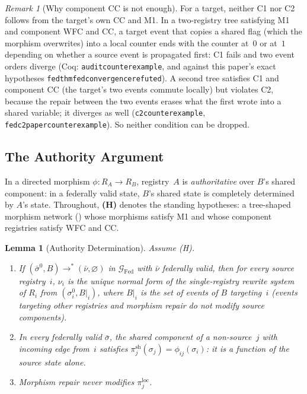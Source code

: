 \documentclass[11pt,a4paper]{article}
\theoremstyle{plain}
\newtheorem{lemma}[theorem]{Lemma}
\theoremstyle{definition}
\theoremstyle{remark}
\newtheorem{remark}[theorem]{Remark}
\newcommand{\Fed}{\mathrm{Fed}}
\renewcommand{\_}{\textunderscore\allowbreak}
\begin{document}
\begin{remark}[Why component CC is not enough]
\label{rem:why-c1c2}
For a target, neither C1 nor C2 follows from the target's own CC and M1.  In a
two-registry tree satisfying M1 and component WFC and CC, a target event that
copies a shared flag (which the morphism overwrites) into a local counter ends
with the counter at~$0$ or at~$1$ depending on whether a source event is
propagated first: C1 fails and two event orders diverge (Coq:
\texttt{audit\_counterexample}, and against this paper's exact hypotheses
\texttt{fed\_thm\_fed\_convergence\_refuted}).  A second tree satisfies C1 and
component CC (the target's two events commute locally) but violates C2,
because the repair between the two events erases what the first wrote into a
shared variable; it diverges as well (\texttt{c2\_counterexample},
\texttt{fed\_c2\_paper\_counterexample}).  So neither condition can be dropped.
\end{remark}

\subsection{The Authority Argument}

In a directed morphism $\phi: R_A \to R_B$,
registry~$A$ is \emph{authoritative} over $B$'s shared component: in a
federally valid state, $B$'s shared state is completely determined by $A$'s
state.  Throughout, \textbf{(H)} denotes the standing hypotheses: a tree-shaped
morphism network () whose morphisms satisfy M1 and whose
component registries satisfy WFC and CC.

\begin{lemma}[Authority Determination]
\label{lem:authority}
Assume (H).
\begin{enumerate}[leftmargin=*,nosep,label=(\alph*)]
\item If $(\bar{\sigma}^0, B) \to^* (\bar{\nu}, \varnothing)$ in
  $\mathcal{G}_\Fed$ with $\bar{\nu}$ federally valid, then for every source
  registry~$i$, $\nu_i$ is the unique normal form of the single-registry
  rewrite system of $R_i$ from $(\sigma^0_i, B|_i)$, where $B|_i$ is the set of
  events of $B$ targeting~$i$ (events targeting other registries and morphism
  repair do not modify source components).
\item In every federally valid $\bar{\sigma}$, the shared component of a
  non-source~$j$ with incoming edge from~$i$ satisfies
  $\pi_j^{\mathrm{sh}}(\sigma_j) = \phi_{ij}(\sigma_i)$: it is a function of
  the source state alone.
\item Morphism repair never modifies $\pi_j^{\mathrm{loc}}$.
\end{enumerate}
\end{lemma}
\end{document}
